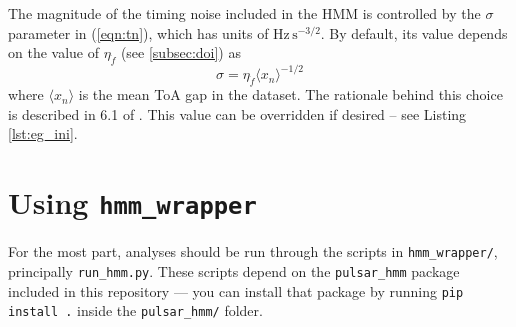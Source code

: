 \documentclass{article}
\begin{document}
The magnitude of the timing noise included in the HMM is controlled by the $\sigma$ parameter in (\ref{eqn:tn}), which has units of $\mathrm{Hz}\,\mathrm{s}^{-3/2}$.
By default, its value depends on the value of $\eta_{\dot{f}}$ (see \ref{subsec:doi}) as \begin{equation} \sigma = \eta_{\dot{f}}\langle x_n\rangle^{-1/2}\end{equation} where $\langle x_n\rangle$ is the mean ToA gap in the dataset.
The rationale behind this choice is described in 6.1 of \citet{MelatosDunn2020}.
This value can be overridden if desired -- see Listing \ref{lst:eg_ini}.


\section{Using \texttt{hmm\_wrapper}}
\label{sec:hmm_wrapper}
For the most part, analyses should be run through the scripts in \texttt{hmm\_wrapper/}, principally \texttt{run\_hmm.py}.
These scripts depend on the \texttt{pulsar\_hmm} package included in this repository --- you can install that package by running \texttt{pip install .} inside the \texttt{pulsar\_hmm/} folder.
\end{document}
